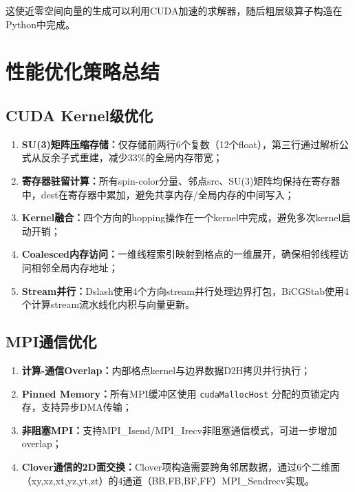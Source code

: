 \documentclass[11pt,a4paper]{article}
\begin{document}
这使近零空间向量的生成可以利用CUDA加速的求解器，随后粗层级算子构造在Python中完成。

\section{性能优化策略总结}

\subsection{CUDA Kernel级优化}

\begin{enumerate}
    \item \textbf{SU(3)矩阵压缩存储：}仅存储前两行6个复数（12个float），第三行通过解析公式从反余子式重建，减少33\%的全局内存带宽；
    \item \textbf{寄存器驻留计算：}所有spin-color分量、邻点src、SU(3)矩阵均保持在寄存器中，dest在寄存器中累加，避免共享内存/全局内存的中间写入；
    \item \textbf{Kernel融合：}四个方向的hopping操作在一个kernel中完成，避免多次kernel启动开销；
    \item \textbf{Coalesced内存访问：}一维线程索引映射到格点的一维展开，确保相邻线程访问相邻全局内存地址；
    \item \textbf{Stream并行：}Dslash使用4个方向stream并行处理边界打包，BiCGStab使用4个计算stream流水线化内积与向量更新。
\end{enumerate}

\subsection{MPI通信优化}

\begin{enumerate}
    \item \textbf{计算-通信Overlap：}内部格点kernel与边界数据D2H拷贝并行执行；
    \item \textbf{Pinned Memory：}所有MPI缓冲区使用 \texttt{cudaMallocHost} 分配的页锁定内存，支持异步DMA传输；
    \item \textbf{非阻塞MPI：}支持MPI\_Isend/MPI\_Irecv非阻塞通信模式，可进一步增加overlap；
    \item \textbf{Clover通信的2D面交换：}Clover项构造需要跨角邻居数据，通过6个二维面（xy,xz,xt,yz,yt,zt）的4通道（BB,FB,BF,FF）MPI\_Sendrecv实现。
\end{enumerate}
\end{document}
